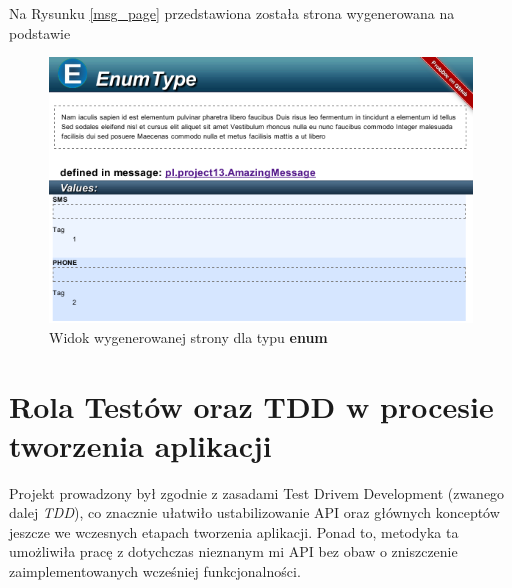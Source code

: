 \documentclass[pdflatex,11pt]{aghdpl}
\begin{document}
Na Rysunku \ref{msg_page} przedstawiona została strona wygenerowana na podstawie 

\begin{figure}[hc]
 \begin{center}
  \includegraphics[width=\textwidth]{../protodoc_enum.png}
 \end{center}
 \caption{Widok wygenerowanej strony dla typu \textbf{enum}}
 \label{enum_page}
\end{figure}


\chapter{Rola Testów oraz TDD w procesie tworzenia aplikacji}
\label{chapter:tdd}

Projekt prowadzony był zgodnie z zasadami Test Drivem Development (zwanego dalej \textit{TDD}),
co znacznie ułatwiło ustabilizowanie API oraz głównych konceptów jeszcze we wczesnych etapach tworzenia aplikacji.
Ponad to, metodyka ta umożliwiła pracę z dotychczas nieznanym mi API bez obaw o zniszczenie zaimplementowanych wcześniej funkcjonalności.
\end{document}
